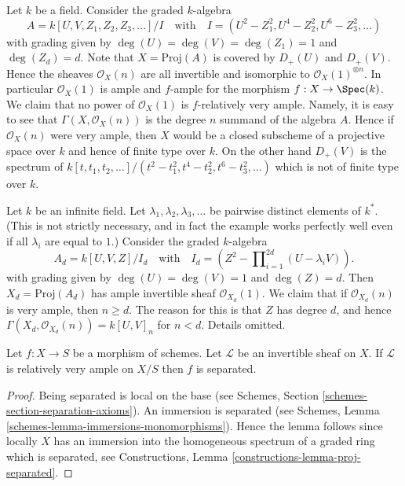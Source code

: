 \begin{example}
\label{example-not-finite-type-proj}
Let $k$ be a field.
Consider the graded $k$-algebra
$$
A = k[U, V, Z_1, Z_2, Z_3, \ldots]/I
\quad
\text{with}
\quad
I = (U^2 - Z_1^2, U^4 - Z_2^2, U^6 - Z_3^2, \ldots)
$$
with grading given by $\deg(U) = \deg(V) = \deg(Z_1) = 1$
and $\deg(Z_d) = d$.
Note that $X = \text{Proj}(A)$ is covered by $D_{+}(U)$ and
$D_{+}(V)$. Hence the sheaves $\mathcal{O}_X(n)$ are all
invertible and isomorphic to $\mathcal{O}_X(1)^{\otimes n}$.
In particular $\mathcal{O}_X(1)$ is ample and $f$-ample
for the morphism $f : X \to \Spec(k)$.
We claim that no power of $\mathcal{O}_X(1)$ is $f$-relatively very ample.
Namely, it is easy to see that $\Gamma(X, \mathcal{O}_X(n))$
is the degree $n$ summand of the algebra $A$. Hence if $\mathcal{O}_X(n)$
were very ample, then $X$ would be a closed subscheme of a projective
space over $k$ and hence of finite type over $k$. On the other hand
$D_{+}(V)$ is the spectrum of
$k[t, t_1, t_2, \ldots]/(t^2 - t_1^2, t^4 - t_2^2, t^6 - t_3^2, \ldots)$
which is not of finite type over $k$.
\end{example}

\begin{example}
\label{example-not-bounded}
Let $k$ be an infinite field. Let $\lambda_1, \lambda_2, \lambda_3, \ldots$
be pairwise distinct elements of $k^*$. (This is not strictly necessary,
and in fact the example works perfectly well even if all $\lambda_i$
are equal to $1$.)
Consider the graded $k$-algebra
$$
A_d = k[U, V, Z]/I_d
\quad
\text{with}
\quad
I_d = (Z^2 - \prod\nolimits_{i = 1}^{2d} (U - \lambda_i V)).
$$
with grading given by $\deg(U) = \deg(V) = 1$ and $\deg(Z) = d$.
Then $X_d = \text{Proj}(A_d)$ has ample invertible sheaf
$\mathcal{O}_{X_d}(1)$. We claim that if $\mathcal{O}_{X_d}(n)$
is very ample, then $n \geq d$. The reason for this is that $Z$
has degree $d$, and hence $\Gamma(X_d, \mathcal{O}_{X_d}(n)) =
k[U, V]_n$ for $n < d$. Details omitted.
\end{example}

\begin{lemma}
\label{lemma-relatively-very-ample-separated}
Let $f : X \to S$ be a morphism of schemes.
Let $\mathcal{L}$ be an invertible sheaf on $X$.
If $\mathcal{L}$ is relatively very ample on $X/S$ then
$f$ is separated.
\end{lemma}

\begin{proof}
Being separated is local on the base (see
Schemes, Section \ref{schemes-section-separation-axioms}).
An immersion is separated
(see Schemes, Lemma \ref{schemes-lemma-immersions-monomorphisms}).
Hence the lemma follows since locally $X$ has an immersion into
the homogeneous spectrum of a graded ring which is separated, see
Constructions, Lemma \ref{constructions-lemma-proj-separated}.
\end{proof}

